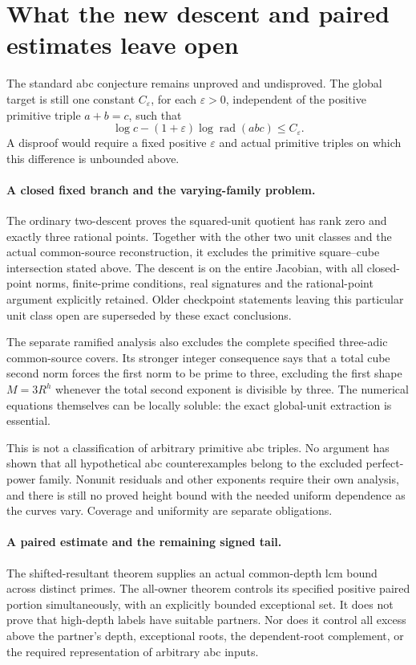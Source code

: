 \section{What the new descent and paired estimates leave open}
\label{dsx-status}

The standard abc conjecture remains unproved and undisproved. The global
target is still one constant \(C_\varepsilon\), for each
\(\varepsilon>0\), independent of the positive primitive triple
\(a+b=c\), such that
\[
 \log c-(1+\varepsilon)\log\operatorname{rad}(abc)
       \le C_\varepsilon .
\]
A disproof would require a fixed positive \(\varepsilon\) and actual
primitive triples on which this difference is unbounded above.

\paragraph{A closed fixed branch and the varying-family problem.}
The ordinary two-descent proves the squared-unit quotient has rank zero
and exactly three rational points. Together with the other two unit
classes and the actual common-source reconstruction, it excludes the
primitive square--cube intersection stated above. The descent is on the
entire Jacobian, with all closed-point norms, finite-prime conditions,
real signatures and the rational-point argument explicitly retained.
Older checkpoint statements leaving this particular unit class open
are superseded by these exact conclusions.

The separate ramified analysis also excludes the complete specified
three-adic common-source covers. Its stronger integer consequence says
that a total cube second norm forces the first norm to be prime to
three, excluding the first shape \(M=3R^h\) whenever the total second
exponent is divisible by three. The numerical equations themselves
can be locally soluble: the exact global-unit extraction is essential.

This is not a classification of arbitrary primitive abc triples.
No argument has shown that all hypothetical abc counterexamples belong
to the excluded perfect-power family. Nonunit residuals and other
exponents require their own analysis, and there is still no proved
height bound with the needed uniform dependence as the curves vary.
Coverage and uniformity are separate obligations.

\paragraph{A paired estimate and the remaining signed tail.}
The shifted-resultant theorem supplies an actual common-depth lcm
bound across distinct primes. The all-owner theorem controls its
specified positive paired portion simultaneously, with an explicitly
bounded exceptional set. It does not prove that high-depth labels
have suitable partners. Nor does it control all excess above the
partner's depth, exceptional roots, the dependent-root complement,
or the required representation of arbitrary abc inputs.

